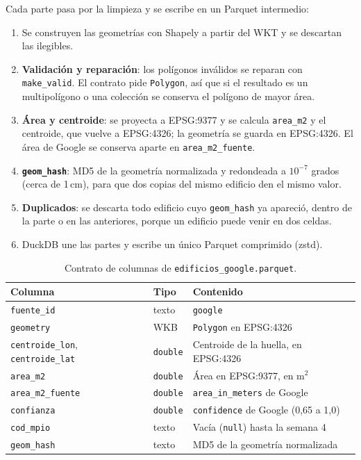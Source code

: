 \documentclass[11pt,a4paper]{article}
\newcommand{\campo}[1]{\texttt{#1}}
\begin{document}
Cada parte pasa por la limpieza y se escribe en un Parquet intermedio:
\begin{enumerate}[leftmargin=*]
  \item Se construyen las geometrías con Shapely a partir del WKT y se
        descartan las ilegibles.
  \item \textbf{Validación y reparación}: los polígonos inválidos se reparan
        con \campo{make\_valid}. El contrato pide \campo{Polygon}, así que si el
        resultado es un multipolígono o una colección se conserva el polígono
        de mayor área.
  \item \textbf{Área y centroide}: se proyecta a EPSG:9377 y se calcula
        \campo{area\_m2} y el centroide, que vuelve a EPSG:4326; la geometría
        se guarda en EPSG:4326. El área de Google se conserva aparte en
        \campo{area\_m2\_fuente}.
  \item \textbf{\campo{geom\_hash}}: MD5 de la geometría normalizada y
        redondeada a $10^{-7}$ grados (cerca de 1\,cm), para que dos
        copias del mismo edificio den el mismo valor.
  \item \textbf{Duplicados}: se descarta todo edificio cuyo
        \campo{geom\_hash} ya apareció, dentro de la parte o en las
        anteriores, porque un edificio puede venir en dos celdas.
  \item DuckDB une las partes y escribe un único Parquet comprimido (zstd).
\end{enumerate}

\begin{table}[H]
\centering\small
\caption{Contrato de columnas de \campo{edificios\_google.parquet}.}
\label{tab:g-contrato}
\begin{tabularx}{\textwidth}{@{}p{3.6cm}p{2.4cm}L@{}}
\toprule
\textbf{Columna} & \textbf{Tipo} & \textbf{Contenido} \\
\midrule
\campo{fuente\_id} & texto & \campo{google} \\
\campo{geometry} & WKB & \campo{Polygon} en EPSG:4326 \\
\campo{centroide\_lon}, \campo{centroide\_lat} & \campo{double} & Centroide de la huella, en EPSG:4326 \\
\campo{area\_m2} & \campo{double} & Área en EPSG:9377, en m$^2$ \\
\campo{area\_m2\_fuente} & \campo{double} & \campo{area\_in\_meters} de Google \\
\campo{confianza} & \campo{double} & \campo{confidence} de Google (0,65 a 1,0) \\
\campo{cod\_mpio} & texto & Vacía (\campo{null}) hasta la semana 4 \\
\campo{geom\_hash} & texto & MD5 de la geometría normalizada \\
\bottomrule
\end{tabularx}
\end{table}
\end{document}
